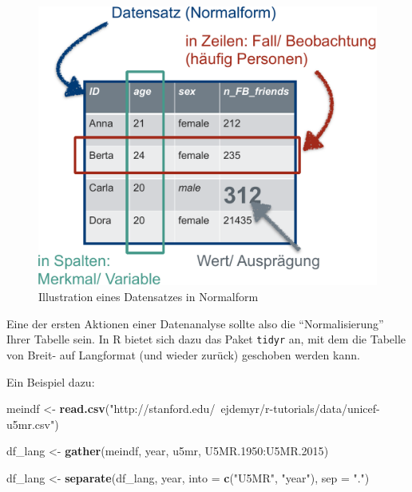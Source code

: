 \documentclass[12pt,]{book}
\newenvironment{Shaded}{\begin{snugshade}}{\end{snugshade}}
\newcommand{\KeywordTok}[1]{\textcolor[rgb]{0.13,0.29,0.53}{\textbf{{#1}}}}
\newcommand{\DataTypeTok}[1]{\textcolor[rgb]{0.13,0.29,0.53}{{#1}}}
\newcommand{\FloatTok}[1]{\textcolor[rgb]{0.00,0.00,0.81}{{#1}}}
\newcommand{\StringTok}[1]{\textcolor[rgb]{0.31,0.60,0.02}{{#1}}}
\newcommand{\NormalTok}[1]{{#1}}
\begin{document}
\begin{figure}

{\centering \includegraphics[width=0.7\linewidth]{images/Normalform} 

}

\caption{Illustration eines Datensatzes in Normalform}\label{fig:fig-Normalform}
\end{figure}

Eine der ersten Aktionen einer Datenanalyse sollte also die
``Normalisierung'' Ihrer Tabelle sein. In R bietet sich dazu das Paket
\texttt{tidyr} an, mit dem die Tabelle von Breit- auf Langformat (und
wieder zurück) geschoben werden kann.

Ein Beispiel dazu:

\begin{Shaded}
\begin{Highlighting}[]
\NormalTok{meindf <-}\StringTok{ }\KeywordTok{read.csv}\NormalTok{(}\StringTok{"http://stanford.edu/~ejdemyr/r-tutorials/data/unicef-u5mr.csv"}\NormalTok{)}

\NormalTok{df_lang <-}\StringTok{ }\KeywordTok{gather}\NormalTok{(meindf, year, u5mr, U5MR}\FloatTok{.1950}\NormalTok{:U5MR}\FloatTok{.2015}\NormalTok{)}

\NormalTok{df_lang <-}\StringTok{ }\KeywordTok{separate}\NormalTok{(df_lang, year, }\DataTypeTok{into =} \KeywordTok{c}\NormalTok{(}\StringTok{"U5MR"}\NormalTok{, }\StringTok{"year"}\NormalTok{), }\DataTypeTok{sep =} \StringTok{"."}\NormalTok{)}
\end{Highlighting}
\end{Shaded}
\end{document}
